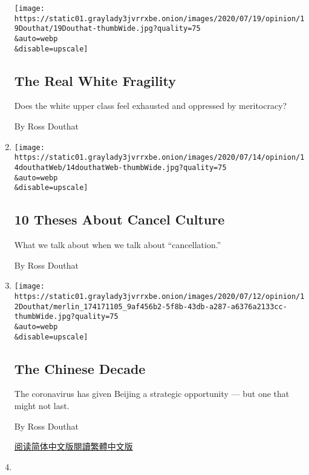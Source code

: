 \begin{enumerate}
  \texttt{[image: https://static01.graylady3jvrrxbe.onion/images/2020/07/19/opinion/19Douthat/19Douthat-thumbWide.jpg?quality=75\\\&auto=webp\\\&disable=upscale]}

  \hypertarget{the-real-white-fragility}{%
  \subsection{The Real White Fragility}\label{the-real-white-fragility}}

  Does the white upper class feel exhausted and oppressed by
  meritocracy?

  By Ross Douthat
\item
  \href{/2020/07/14/opinion/cancel-culture-.html}{}

  \texttt{[image: https://static01.graylady3jvrrxbe.onion/images/2020/07/14/opinion/14douthatWeb/14douthatWeb-thumbWide.jpg?quality=75\\\&auto=webp\\\&disable=upscale]}

  \hypertarget{10-theses-about-cancel-culture}{%
  \subsection{10 Theses About Cancel
  Culture}\label{10-theses-about-cancel-culture}}

  What we talk about when we talk about ``cancellation.''

  By Ross Douthat
\item
  \href{/2020/07/11/opinion/sunday/china-coronavirus-power.html}{}

  \texttt{[image: https://static01.graylady3jvrrxbe.onion/images/2020/07/12/opinion/12Douthat/merlin\_174171105\_9af456b2-5f8b-43db-a287-a6376a2133cc-thumbWide.jpg?quality=75\\\&auto=webp\\\&disable=upscale]}

  \hypertarget{the-chinese-decade}{%
  \subsection{The Chinese Decade}\label{the-chinese-decade}}

  The coronavirus has given Beijing a strategic opportunity --- but one
  that might not last.

  By Ross Douthat

  \href{https://cn.nytimes3xbfgragh.onion/opinion/20200713/china-coronavirus-power/}{阅读简体中文版}\href{https://cn.nytimes3xbfgragh.onion/opinion/20200713/china-coronavirus-power/zh-hant/}{閱讀繁體中文版}
\item
  \href{/2020/07/07/opinion/protestant-progressive-reformation.html}{}


\end{enumerate}
